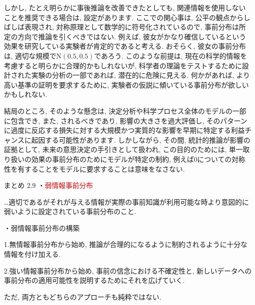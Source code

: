 \documentclass[10pt,dvipdfmx,a4]{beamer}
\newcommand{\tcr}[1]{\textcolor{red}{#1}}
\begin{document}

\begin{frame}
しかし, たとえ明らかに事後推論を改善できたとしても, 関連情報を使用しないことを推奨できる場合は, 設定があります.
ここでの関心事は, 公平の観点からしばしば表現され, 対称原理として数学的に符号化されているので, 事前分布は所定の方向で推論を引くべきではない.
例えば, 彼女がかなり確信しているという効果を研究している実験者が肯定的であると考える.
おそらく, 彼女の事前分布は, 適切な規模で$\text{N}(0.5, 0.5)$であろう.
このような前提は, 現在の科学的情報を考慮すると明らかに合理的かもしれないが, 科学者の理論をテストするために設計された実験の分析の一部であれば, 潜在的に危険に見える.
何かがあれば, より高い基準の証明を要求するために, 実験者の仮説に傾いている事前分布が欲しいかもしれない.

結局のところ, そのような懸念は, 決定分析や科学プロセス全体のモデルの一部に包含でき, また, されるべきであり, 影響の大きさを過大評価し, そのパターンに過度に反応する損失に対する大規模かつ実質的な影響を早期に特定する利益チャンスに起因する可能性があります.
しかしながら, その間, 統計的推論が影響の証拠として, 未来の意思決定の手引きとして扱われ, この目的のためには, 単一取り扱いの効果の事前分布のためにモデルが特定の制約, 例えば0についての対称性を有することをモデルに要求することは意味をなさない.
\end{frame}


\begin{frame}{まとめ 2.9}
・\tcr{弱情報事前分布}

…適切であるがそれが与える情報が実際の事前知識が利用可能な時より意図的に弱いように設定されている事前分布のこと.

・弱情報事前分布の構築

1.無情報事前分布から始め, 推論が合理的になるように制約されるように十分な情報を付け加える.

2.強い情報事前分布から始め, 事前の信念における不確定性と, 新しいデータへの事前分布の適用可能性を説明するためにそれを広げていく.

ただ, 両方ともどちらのアプローチも純粋ではない.
\end{frame}


\end{document}
